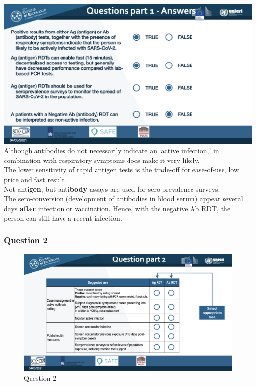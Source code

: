 \documentclass[
]{book}
\begin{document}
\includegraphics{images/m03/m03_questions_v2.002.jpeg}
Although antibodies do not necessarily indicate an `active infection,' in combination with respiratory symptoms does make it very likely.\\
The lower sensitivity of rapid antigen tests is the trade-off for ease-of-use, low price and fast result.\\
Not anti\textbf{gen}, but anti\textbf{body} assays are used for sero-prevalence surveys.\\
The sero-conversion (development of antibodies in blood serum) appear several days \textbf{after} infection or vaccination. Hence, with the negative Ab RDT, the person can still have a recent infection.

\hypertarget{question-2-1}{%
\subsubsection{Question 2}\label{question-2-1}}

\begin{figure}
\centering
\includegraphics{images/m03/m03_questions_v2.003.jpeg}
\caption{Question 2}
\end{figure}
\end{document}
